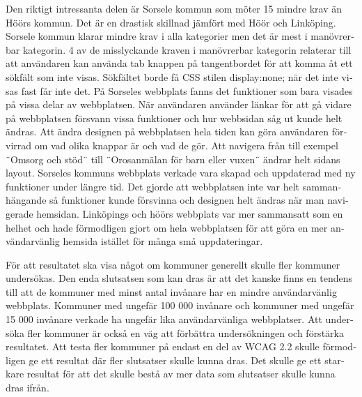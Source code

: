 \documentclass[11p]{article}
\begin{document}
\begin{otherlanguage}{swedish}
    Den riktigt intressanta delen är Sorsele kommun som möter 15 mindre krav än Höörs kommun.
    Det är en drastisk skillnad jämfört med Höör och Linköping.
    Sorsele kommun klarar mindre krav i alla kategorier men det är mest i manövrerbar kategorin.
    4 av de misslyckande kraven i manövrerbar kategorin relaterar till att användaren kan använda tab knappen på tangentbordet för att komma åt ett sökfält som inte visas.
    Sökfältet borde få CSS stilen display:none; när det inte visas fast får inte det.
    På Sorseles webbplats fanns det funktioner som bara visades på vissa delar av webbplatsen.
    När användaren använder länkar för att gå vidare på webbplatsen försvann vissa funktioner och hur webbsidan såg ut kunde helt ändras.
    Att ändra designen på webbplatsen hela tiden kan göra användaren förvirrad om vad olika knappar är och vad de gör.
    Att navigera från till exempel ¨Omsorg och stöd¨ till ¨Orosanmälan för barn eller vuxen¨ ändrar helt sidans layout.
    Sorseles kommuns webbplats verkade vara skapad och uppdaterad med ny funktioner under längre tid.
    Det gjorde att webbplatsen inte var helt sammanhängande så funktioner kunde försvinna och designen helt ändras när man navigerade hemsidan.
    Linköpings och höörs webbplats var mer sammansatt som en helhet och hade förmodligen gjort om hela webbplatsen för att göra en mer användarvänlig hemsida istället för många små uppdateringar.


    För att resultatet ska visa något om kommuner generellt skulle fler kommuner undersökas.
    Den enda slutsatsen som kan dras är att det kanske finns en tendens till att de kommuner med minst antal invånare har en mindre användarvänlig webbplats.
    Kommuner med ungefär 100 000 invånare och kommuner med ungefär 15 000 invånare verkade ha ungefär lika användarvänliga webbplatser.
    Att undersöka fler kommuner är också en väg att förbättra undersökningen och förstärka resultatet.
    Att testa fler kommuner på endast en del av WCAG 2.2 skulle förmodligen ge ett resultat där fler slutsatser skulle kunna dras.
    Det skulle ge ett starkare resultat för att det skulle bestå av mer data som slutsatser skulle kunna dras ifrån.


\end{otherlanguage}
\end{document}
